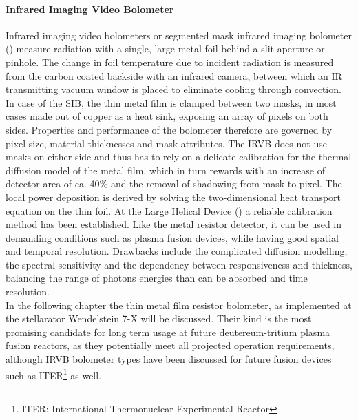             \paragraph{Infrared Imaging Video Bolometer}%
%
                Infrared imaging video bolometers or segmented mask infrared imaging bolometer () measure radiation with a single, large metal foil behind a slit aperture or pinhole. The change in foil temperature due to incident radiation is measured from the carbon coated backside with an infrared camera, between which an IR transmitting vacuum window is placed to eliminate cooling through convection. In case of the SIB, the thin metal film is clamped between two masks, in most cases made out of copper as a heat sink, exposing an array of pixels on both sides. Properties and performance of the bolometer therefore are governed by pixel size, material thicknesses and mask attributes. The IRVB does not use masks on either side and thus has to rely on a delicate calibration for the thermal diffusion model of the metal film, which in turn rewards with an increase of detector area of ca. 40\% and the removal of shadowing from mask to pixel\cite{Peterson2000,Peterson2016}. The local power deposition is derived by solving the two-dimensional heat transport equation on the thin foil. At the Large Helical Device () a reliable calibration method has been established\cite{Peterson2003_1,Pandya2014}. Like the metal resistor detector, it can be used in demanding conditions such as plasma fusion devices, while having good spatial and temporal resolution. Drawbacks include the complicated diffusion modelling, the spectral sensitivity and the dependency between responsiveness and thickness, balancing the range of photons energies than can be absorbed and time resolution\cite{Peterson2003_2}.\\%
%
        In the following chapter the thin metal film resistor bolometer, as implemented at the stellarator Wendelstein 7-X will be discussed. Their kind is the most promising candidate for long term usage at future deutereum-tritium plasma fusion reactors, as they potentially meet all projected operation requirements\cite{Meister2008}, although IRVB bolometer types have been discussed for future fusion devices such as ITER\footnote[3]{ITER: International Thermonuclear Experimental Reactor} as well.%

